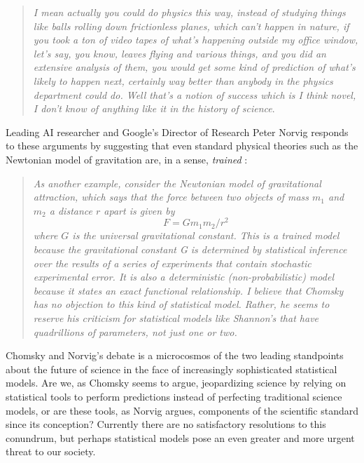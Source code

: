 \documentclass[fleqn,10pt]{article}
\begin{document}
\begin{quotation}
\textsl{I mean actually you could do physics this way, instead of studying things like balls rolling down frictionless planes, which can't happen in nature, if you took a ton of video tapes of what's happening outside my office window, let's say, you know, leaves flying and various things, and you did an extensive analysis of them, you would get some kind of prediction of what's likely to happen next, certainly way better than anybody in the physics department could do. Well that's a notion of success which is I think novel, I don't know of anything like it in the history of science}.
\end{quotation}

Leading AI researcher and Google's Director of Research Peter Norvig responds to these arguments by suggesting that even standard physical theories such as the Newtonian model of gravitation are, in a sense, \emph{trained} \cite{norvig2017chomsky}:

\begin{quotation}
\textsl{As another example, consider the Newtonian model of gravitational attraction, which says that the force between two objects of mass $m_1$ and $m_2$ a distance $r$ apart is given by}
\begin{equation*}
F = G m_1 m_2 / r^2
\end{equation*}
\textsl{where $G$ is the universal gravitational constant. This is a trained model because the gravitational constant G is determined by statistical inference over the results of a series of experiments that contain stochastic experimental error. It is also a deterministic (non-probabilistic) model because it states an exact functional relationship. I believe that Chomsky has no objection to this kind of statistical model. Rather, he seems to reserve his criticism for statistical models like Shannon's that have quadrillions of parameters, not just one or two.}
\end{quotation}

Chomsky and Norvig's debate \cite{norvig2017chomsky} is a microcosmos of the two leading standpoints about the future of science in the face of increasingly sophisticated statistical models. Are we, as Chomsky seems to argue, jeopardizing science by relying on statistical tools to perform predictions instead of perfecting traditional science models, or are these tools, as Norvig argues, components of the scientific standard since its conception? Currently there are no satisfactory resolutions to this conundrum, but perhaps statistical models pose an even greater and more urgent threat to our society. 
\end{document}
